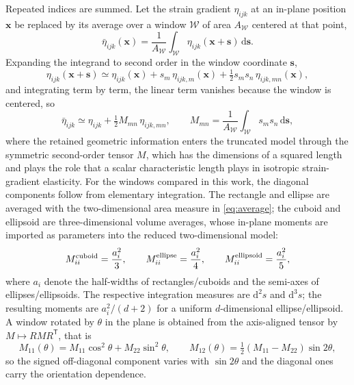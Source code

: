 Repeated indices are summed. Let the strain gradient $\eta_{ijk}$ at an
in-plane position $\bm{x}$ be replaced by its average
over a window $\mathcal{W}$ of area $A_{\mathcal W}$ centered at that point,
\begin{equation}
  \bar\eta_{ijk}(\bm{x}) = \frac{1}{A_{\mathcal W}}
     \int_{\mathcal W} \eta_{ijk}(\bm{x}+\bm{s})\,\mathrm{d}\bm{s}.
  \label{eq:average}
\end{equation}
Expanding the integrand to second order in the window coordinate $\bm{s}$,
\begin{equation}
  \eta_{ijk}(\bm{x}+\bm{s}) \simeq \eta_{ijk}(\bm{x})
     + s_m\,\eta_{ijk,m}(\bm{x}) + \tfrac12 s_m s_n\,\eta_{ijk,mn}(\bm{x}),
  \label{eq:expand}
\end{equation}
and integrating term by term, the linear term vanishes because the window is
centered, so
\begin{equation}
  \bar\eta_{ijk} \simeq \eta_{ijk} + \tfrac12 M_{mn}\,\eta_{ijk,mn},
  \qquad
  M_{mn} = \frac{1}{A_{\mathcal W}}\int_{\mathcal W} s_m s_n \,\mathrm{d}\bm{s},
  \label{eq:Mdef}
\end{equation}
where the retained geometric information enters the truncated model through
the symmetric second-order tensor $M$, which has the dimensions of a squared
length and plays the role that a scalar characteristic length plays in
isotropic strain-gradient elasticity. For the windows compared in this work, the diagonal components follow from elementary integration.
The rectangle and ellipse are averaged with the two-dimensional area measure
in \eqref{eq:average}; the cuboid and ellipsoid are three-dimensional
volume averages, whose in-plane moments are imported as parameters into
the reduced two-dimensional model:
\begin{equation}
  M^{\rm cuboid}_{ii} = \frac{a_i^2}{3},\qquad
  M^{\rm ellipse}_{ii} = \frac{a_i^2}{4},\qquad
  M^{\rm ellipsoid}_{ii} = \frac{a_i^2}{5},
  \label{eq:Mshapes}
\end{equation}
where $a_i$ denote the half-widths of rectangles/cuboids and the semi-axes
of ellipses/ellipsoids. The respective integration measures are
$\mathrm{d}^2 s$ and $\mathrm{d}^3 s$; the resulting moments are
$a_i^2/(d+2)$ for a uniform $d$-dimensional ellipse/ellipsoid.
A window rotated by $\theta$ in the plane is obtained from the axis-aligned
tensor by $M\mapsto RMR^{\mathsf T}$, that is
\begin{equation}
  M_{11}(\theta)=M_{11}\cos^{2}\theta+M_{22}\sin^{2}\theta,\qquad
  M_{12}(\theta)=\tfrac12\left(M_{11}-M_{22}\right)\sin2\theta,
  \label{eq:Mrot2}
\end{equation}
so the signed off-diagonal component varies with $\sin2\theta$ and the diagonal ones
carry the orientation dependence.


